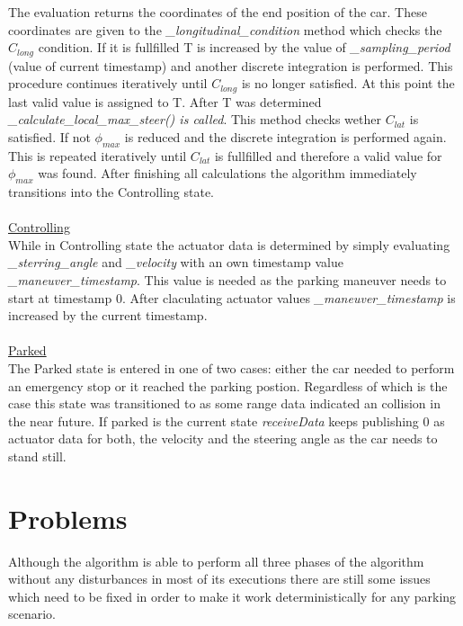 \documentclass[paper=a4, fontsize=11pt]{scrreprt}
\begin{document}
The evaluation returns the coordinates of the end position of the car. These coordinates are given to the \textit{\_longitudinal\_condition} method which checks the $C_{long}$ condition. If it is fullfilled T is increased by the value of \textit{\_sampling\_period} (value of current timestamp) and another discrete integration is performed. This procedure continues iteratively until $C_{long}$ is no longer satisfied. At this point the last valid value is assigned to T. After T was determined \textit{\_calculate\_local\_max\_steer() is called}. This method checks wether $C_{lat}$ is satisfied. If not $\phi_{max}$ is reduced and the discrete integration is performed again. This is repeated iteratively until $C_{lat}$ is fullfilled and therefore a valid value for $\phi_{max}$ was found. After finishing all calculations the algorithm immediately transitions into the Controlling state.\\
\\
\underline{Controlling}\\
While in Controlling state the actuator data is determined by simply evaluating \textit{\_sterring\_angle} and \textit{\_velocity} with an own timestamp value \textit{\_maneuver\_timestamp}. This value is needed as the parking maneuver needs to start at timestamp 0. After claculating actuator values \textit{\_maneuver\_timestamp} is increased by the current timestamp.\\
\\
\underline{Parked}\\
The Parked state is entered in one of two cases: either the car needed to perform an emergency stop or it reached the parking postion. Regardless of which is the case this state was transitioned to as some range data indicated an collision in the near future. If parked is the current state \textit{receiveData} keeps publishing 0 as actuator data for both, the velocity and the steering angle as the car needs to stand still.
\section{Problems}
Although the algorithm is able to perform all three phases of the algorithm without any disturbances in most of its executions there are still some issues which need to be fixed in order to make it work deterministically for any parking scenario.
\end{document}
